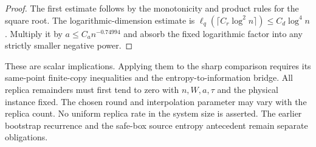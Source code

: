 \begin{proof}
    \leanok
    The first estimate follows by the monotonicity and product
    rules for the square root. The logarithmic-dimension estimate is
    $\ell_q(\lceil C_r\log^2n\rceil)\leq C_d\log^4n$.
    Multiply it by $a\leq C_an^{-0.74994}$ and absorb the fixed
    logarithmic factor into any strictly smaller negative power.
\end{proof}

These are scalar implications. Applying them to the sharp comparison
requires its same-point finite-copy inequalities and the entropy-to-information
bridge. All replica remainders must first tend to zero with $n,W,a,\tau$
and the physical instance fixed. The chosen round and interpolation parameter
may vary with the replica count. No uniform replica rate in the system size
is asserted. The earlier bootstrap recurrence and the safe-box source
entropy antecedent remain separate obligations.
